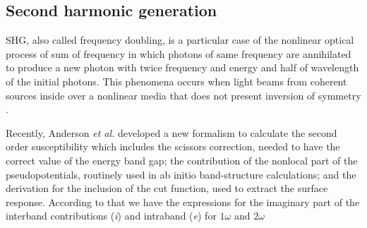 \documentclass[aps,pra,11pt,tightenlines,showpacs,superscriptaddress,groupedaddress]{revtex4-1}
\begin{document}
    \subsection{Second harmonic generation}

SHG, also called frequency doubling, is a particular case of the nonlinear
optical process of sum of frequency in which photons of same frequency are
annihilated to produce a new photon with twice frequency and energy and half of
wavelength of the initial photons. This phenomena occurs when light beams from
coherent sources inside over a nonlinear media that does not present inversion
of symmetry \cite{bloembergen1962light,anderson2015theory,salazar2014molecular,
sipe2000second}.

Recently, Anderson \emph{et al.} \cite{anderson2015theory} developed a new
formalism to calculate the second order susceptibility which includes the
scissors correction, needed to have the correct value of the energy band gap;
the contribution of the nonlocal part of the pseudopotentials, routinely used
in ab initio band-structure calculations; and the derivation for the inclusion
of the cut function, used to extract the surface response. According to that we
have the expressions for the imaginary part of the interband contributions
(\emph{i}) and intraband (\emph{e}) for $1\omega$ and $2\omega$
\end{document}
